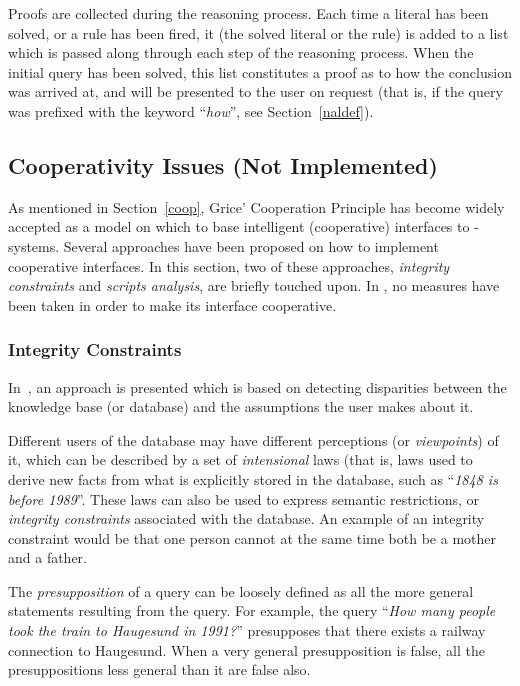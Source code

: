 Proofs are collected during the reasoning process. Each time a literal
has been solved, or a rule has been fired, it (the solved literal or
the rule) is added to a list which is passed along through each step
of the reasoning process. When the initial query has been solved, this
list constitutes a proof as to how the conclusion was arrived at, and
will be presented to the user on request (that is, if the query was
prefixed with the keyword ``{\em how\/}'', see Section~\ref{naldef}).

\subsection{Cooperativity Issues (Not Implemented)}
\label{notcoop}

As mentioned in Section~\ref{coop}, Grice' Cooperation Principle has
become widely accepted as a model on which to base intelligent
(cooperative) interfaces to {\nlp}-systems. Several approaches have
been proposed on how to implement cooperative interfaces. In this
section, two of these approaches, {\em integrity constraints\/} and
{\em scripts analysis\/}, are briefly touched upon. In {\nash}, no
measures have been taken in order to make its interface cooperative.

\subsubsection{Integrity Constraints}

In~\cite{gal}, an approach is presented which is based on detecting
disparities between the knowledge base (or database) and the
assumptions the user makes about it. 

Different users of the database may have different perceptions (or
{\em viewpoints\/}) of it, which can be described by a set of {\em
intensional\/} laws (that is, laws used to derive new facts from what
is explicitly stored in the database, such as ``{\em 1848 is before
1989\/}''. These laws can also be used to express semantic
restrictions, or {\em integrity constraints\/} associated with the
database. An example of an integrity constraint would be that one
person cannot at the same time both be a mother and a father.

The {\em presupposition\/} of a query can be loosely defined as all
the more general statements resulting from the query. For example, the
query ``{\em How many people took the train to Haugesund in 1991?\/}''
presupposes that there exists a railway connection to Haugesund. When
a very general presupposition is false, all the presuppositions less
general than it are false also.

